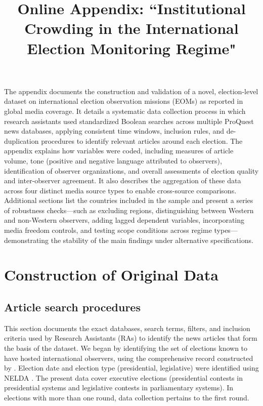 \documentclass[USletter,12pt, titlepage]{article} %
\title{Online Appendix: ``Institutional Crowding in the International Election Monitoring Regime"}
\begin{document}
\maketitle
\tableofcontents

\newpage
\newpage
\appendix

\newpage

The appendix documents the construction and validation of a novel, election-level dataset on international election observation missions (EOMs) as reported in global media coverage. It details a systematic data collection process in which research assistants used standardized Boolean searches across multiple ProQuest news databases, applying consistent time windows, inclusion rules, and de-duplication procedures to identify relevant articles around each election. The appendix explains how variables were coded, including measures of article volume, tone (positive and negative language attributed to observers), identification of observer organizations, and overall assessments of election quality and inter-observer agreement. It also describes the aggregation of these data across four distinct media source types to enable cross-source comparisons. Additional sections list the countries included in the sample and present a series of robustness checks—such as excluding regions, distinguishing between Western and non-Western observers, adding lagged dependent variables, incorporating media freedom controls, and testing scope conditions across regime types—demonstrating the stability of the main findings under alternative specifications.

\section{Construction of Original Data}
\subsection{Article search procedures}

This section documents the exact databases, search terms, filters, and inclusion criteria used by Research Assistants (RAs) to identify the news articles that form the basis of the dataset. We began by identifying the set of elections known to have hosted international observers, using the comprehensive record constructed by \citet{RoussiasRufino2018}. Election date and election type (presidential, legislative) were identified using NELDA \citep{HydeMarinov2012}. The present data cover executive elections (presidential contests in presidential systems and legislative contests in parliamentary systems). In elections with more than one round, data collection pertains to the first round. 
\end{document}

